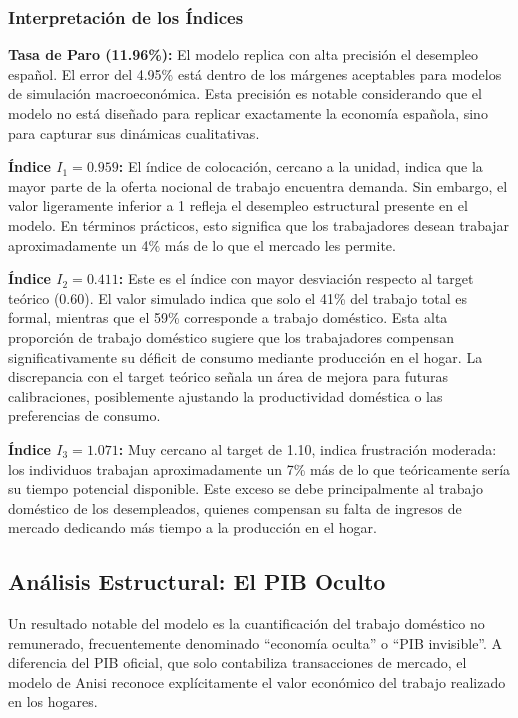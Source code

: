 \subsubsection{Interpretación de los Índices}

\textbf{Tasa de Paro (11.96\%):} El modelo replica con alta precisión el desempleo español. El error del 4.95\% está dentro de los márgenes aceptables para modelos de simulación macroeconómica. Esta precisión es notable considerando que el modelo no está diseñado para replicar exactamente la economía española, sino para capturar sus dinámicas cualitativas.

\textbf{Índice $I_1 = 0.959$:} El índice de colocación, cercano a la unidad, indica que la mayor parte de la oferta nocional de trabajo encuentra demanda. Sin embargo, el valor ligeramente inferior a 1 refleja el desempleo estructural presente en el modelo. En términos prácticos, esto significa que los trabajadores desean trabajar aproximadamente un 4\% más de lo que el mercado les permite.

\textbf{Índice $I_2 = 0.411$:} Este es el índice con mayor desviación respecto al target teórico (0.60). El valor simulado indica que solo el 41\% del trabajo total es formal, mientras que el 59\% corresponde a trabajo doméstico. Esta alta proporción de trabajo doméstico sugiere que los trabajadores compensan significativamente su déficit de consumo mediante producción en el hogar. La discrepancia con el target teórico señala un área de mejora para futuras calibraciones, posiblemente ajustando la productividad doméstica o las preferencias de consumo.

\textbf{Índice $I_3 = 1.071$:} Muy cercano al target de 1.10, indica frustración moderada: los individuos trabajan aproximadamente un 7\% más de lo que teóricamente sería su tiempo potencial disponible. Este exceso se debe principalmente al trabajo doméstico de los desempleados, quienes compensan su falta de ingresos de mercado dedicando más tiempo a la producción en el hogar.

\subsection{Análisis Estructural: El PIB Oculto}

Un resultado notable del modelo es la cuantificación del trabajo doméstico no remunerado, frecuentemente denominado ``economía oculta'' o ``PIB invisible''. A diferencia del PIB oficial, que solo contabiliza transacciones de mercado, el modelo de Anisi reconoce explícitamente el valor económico del trabajo realizado en los hogares.

